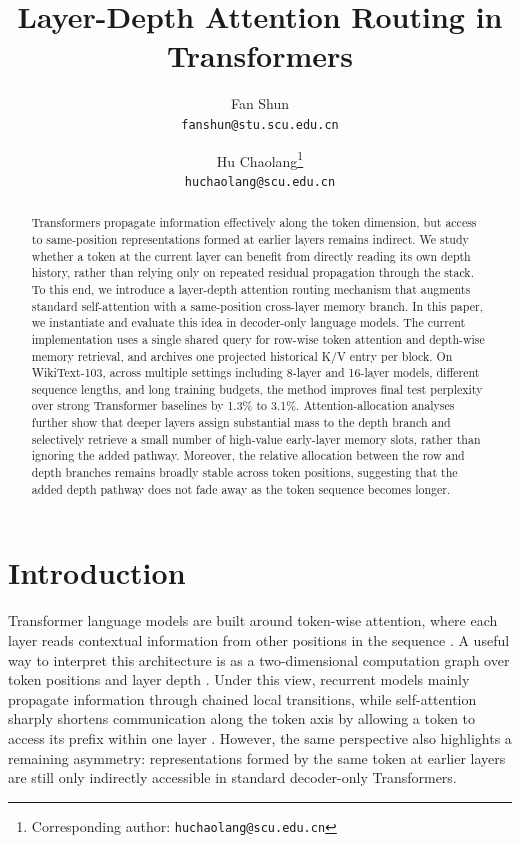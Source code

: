 \documentclass[11pt]{article}
\title{Layer-Depth Attention Routing in Transformers}
\author{
Fan Shun\\
\texttt{fanshun@stu.scu.edu.cn}
\and
Hu Chaolang\thanks{Corresponding author: \texttt{huchaolang@scu.edu.cn}}\\
\texttt{huchaolang@scu.edu.cn}
}
\date{}
\begin{document}
\maketitle

\begin{abstract}
Transformers propagate information effectively along the token dimension, but access to same-position representations formed at earlier layers remains indirect. We study whether a token at the current layer can benefit from directly reading its own depth history, rather than relying only on repeated residual propagation through the stack. To this end, we introduce a layer-depth attention routing mechanism that augments standard self-attention with a same-position cross-layer memory branch. In this paper, we instantiate and evaluate this idea in decoder-only language models. The current implementation uses a single shared query for row-wise token attention and depth-wise memory retrieval, and archives one projected historical K/V entry per block. On WikiText-103, across multiple settings including 8-layer and 16-layer models, different sequence lengths, and long training budgets, the method improves final test perplexity over strong Transformer baselines by 1.3\% to 3.1\%. 
Attention-allocation analyses further show that deeper layers assign substantial mass to the depth branch and selectively retrieve a small number of high-value early-layer memory slots, rather than ignoring the added pathway. Moreover, the relative allocation between the row and depth branches remains broadly stable across token positions, suggesting that the added depth pathway does not fade away as the token sequence becomes longer.


\end{abstract}

\section{Introduction}

Transformer language models are built around token-wise attention, where each layer reads contextual information from other positions in the sequence \cite{vaswani2017attention}. A useful way to interpret this architecture is as a two-dimensional computation graph over token positions and layer depth \cite{zhang2026residual}. Under this view, recurrent models mainly propagate information through chained local transitions, while self-attention sharply shortens communication along the token axis by allowing a token to access its prefix within one layer \cite{vaswani2017attention}. However, the same perspective also highlights a remaining asymmetry: representations formed by the same token at earlier layers are still only indirectly accessible in standard decoder-only Transformers.
\end{document}
